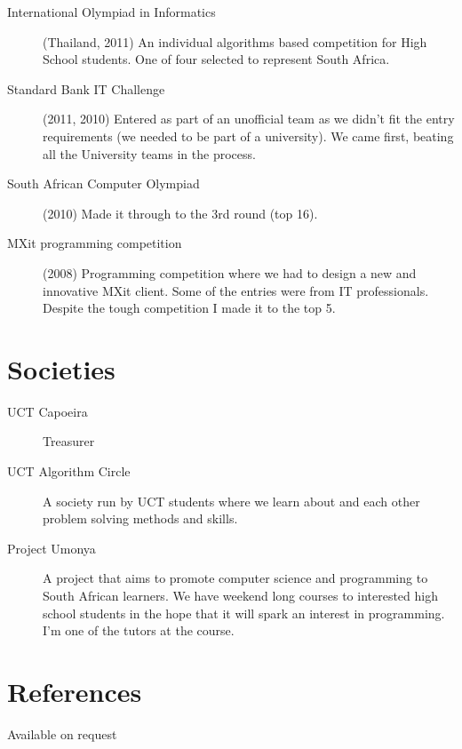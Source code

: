 \documentclass[margin,line,a4paper]{resume}
\begin{document}
\begin{resume}
\begin{description}
                \item [International Olympiad in Informatics] (Thailand, 2011) An individual 
                algorithms based competition for High School students. One of four selected
                to represent South Africa.

                \item [Standard Bank IT Challenge] (2011, 2010) Entered as part of an unofficial team
                as we didn't fit the entry requirements (we needed to be part of a university).
                We came first, beating all the University teams in the process.

                \item [South African Computer Olympiad] (2010) Made it through to the 3rd
                round (top 16).

                \item [MXit programming competition] (2008) Programming competition where we
                had to design a new and innovative MXit client.  Some of the
                entries were from IT professionals. Despite the tough competition I made it to the top 5.
            \end{description}

        \section{\mysidestyle Societies}
            \begin{description}
                \item [UCT Capoeira] Treasurer
                \item [UCT Algorithm Circle] A society run by UCT students where we learn about and
                each other problem solving methods and skills.

                \item [Project Umonya] A project that aims to promote computer science and programming
                to South African learners. We have weekend long courses to interested high school students
                in the hope that it will spark an interest in programming. I'm one of the tutors at the course.
            \end{description}

        \section{\mysidestyle References}
            Available on request
    \end{resume}
\end{document}

